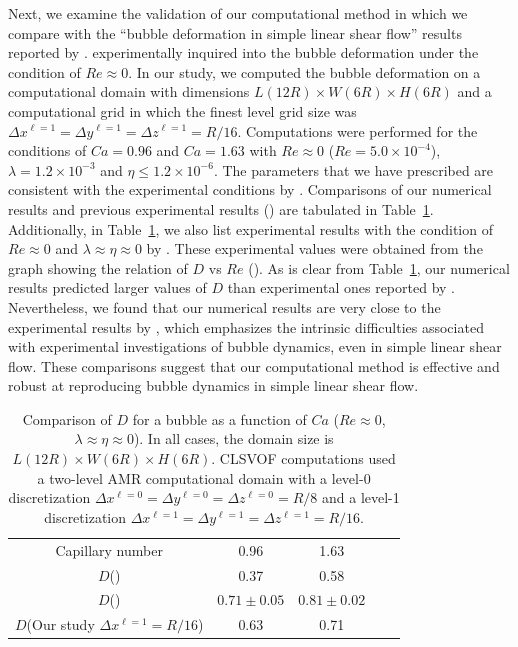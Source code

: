 \documentclass{elsarticle}
\newcommand{\lwh}[3]{L(#1R)\times W(#2R) \times H(#3R)}
\begin{document}

Next, we examine the validation of our computational method in which we compare
with the ``bubble deformation in simple linear shear flow'' results reported by
\citet{MulTobDreFisWin08}.  \citet{MulTobDreFisWin08} experimentally inquired into the bubble
deformation under the condition of $Re \approx 0$.  In our study, we computed
the bubble deformation on a computational domain with dimensions
$\lwh{12}{6}{6}$ and a computational grid in which the finest level grid size
was $\Delta x^{\ell=1} = \Delta y^{\ell=1} = \Delta z^{\ell=1} = R/16$.
Computations were performed for the conditions of $Ca = 0.96$ and $Ca = 1.63$
with $Re \approx 0$ ($Re = 5.0 \times 10^{-4}$),  $\lambda = 1.2 \times
10^{-3}$ and  $\eta \leq 1.2 \times 10^{-6}$.  The parameters that we have
prescribed are consistent with the experimental conditions by  \citet{MulTobDreFisWin08}.  
Comparisons of our numerical results and
previous experimental results (\citet{MulTobDreFisWin08}) are tabulated in
Table~\ref{tab:DeComparisonRe=0}.  Additionally, in
Table~\ref{tab:DeComparisonRe=0}, we also list experimental results with the
condition of $Re \approx 0$ and $\lambda \approx \eta \approx 0$ by  \citet{RusMan02}. 
These experimental values were obtained from the graph showing the relation of $D$ vs
$Re$ (\citet{RusMan02}).  As is clear from Table~\ref{tab:DeComparisonRe=0}, our
numerical results predicted larger values of $D$ than experimental ones
reported by \citet{MulTobDreFisWin08}. Nevertheless, we
found that our numerical results are very close to the experimental results by
\citet{RusMan02}, which emphasizes the intrinsic difficulties
associated with experimental investigations of bubble dynamics, even in simple
linear shear flow.  These comparisons suggest that our computational method is
effective and robust at reproducing bubble dynamics in simple linear shear
flow.

\begin{table}[tbh]
\caption{Comparison of  $D$ for a bubble as a function 
         of $Ca$ ($Re \approx 0$, $\lambda \approx \eta \approx 0$). 
	 In all cases, the domain 
         size is $\lwh{12}{6}{6}$.
         CLSVOF computations used a two-level AMR computational domain 
         with a level-0 discretization $\Delta x^{\ell=0} = \Delta y^{\ell=0} 
         = \Delta z^{\ell=0} = R/8$ and a level-1 discretization
         $\Delta x^{\ell=1} = \Delta y^{\ell=1} = \Delta z^{\ell=1} = R/16$.}

\label{tab:DeComparisonRe=0}
\center
\begin{tabular}{ c  c  c  c  c }
\hline
\hline
Capillary number & 0.96  & 1.63  \\
{$D$}(\citet{MulTobDreFisWin08})   & 0.37   &   0.58     \\
{$D$}(\citet{RusMan02})    & $0.71\pm 0.05$   &   $0.81\pm 0.02$     \\
{$D$}(Our study $\Delta x^{\ell=1}=R/16$)  & 0.63   &   0.71     \\
\hline
\hline
\end{tabular}
\end{table}
\end{document}
